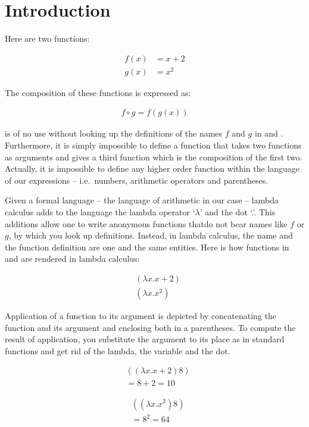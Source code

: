 \documentclass[11pt]{article}
\begin{document}
\section{Introduction} Here are two functions:

\begin{align}
\label{f} f(x) & = x + 2\\
\label{g}g(x) & = x^2
\end{align}

The composition of these functions is expressed as:

\begin{align}
f\circ g = f(g(x))\label{fog}
\end{align}


 is of no use without looking up the definitions of the
names $f$ and $g$ in  and . Furthermore, it is simply
impossible to define a function that takes two functions as arguments
and gives a third function which is the composition of the first two.
Actually, it is impossible to define any higher order function within
the language of our expressions -- i.e.\ numbers, arithmetic operators
and parentheses.

Given a formal language -- the language of arithmetic in our case --
lambda calculus adds to the language the lambda operator `$\lambda$'
and the dot `.'. This additions allow one to write anonymous functions
thatdo not bear names like $f$ or $g$, by which you look up
definitions. Instead, in lambda calculus, the name and the function
definition are one and the same entities. Here is how functions in
 and  are rendered in lambda calculus:

\begin{align}
\label{lf} & (\lambda x.x + 2)\\
\label{lg} & (\lambda x.x^2)
\end{align}

Application of a function to its argument is depicted by concatenating
the function and its argument and enclosing both in a parentheses. To
compute the result of application, you substitute the argument to its
place as in standard functions and get rid of the lambda, the variable
and the dot.

\begin{align}
\label{af} & ((\lambda x.x + 2) 8)\\
 & = 8 +2  = 10\nonumber
\end{align}

\begin{align}
\label{ag} & ((\lambda x.x^2) 8)\\
& = 8^2 = 64\nonumber
\end{align}
\end{document}

